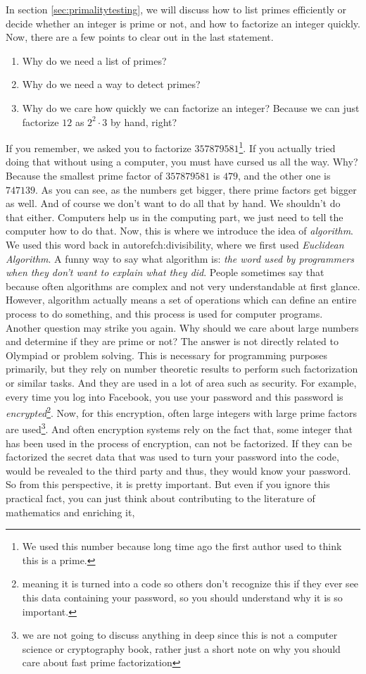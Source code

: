 \documentclass{subfiles}
\begin{document}
	In section \eqref{sec:primalitytesting}, we will discuss how to list primes efficiently or decide whether an integer is prime or not, and how to factorize an integer quickly. Now, there are a few points to clear out in the last statement.
		\begin{enumerate}
			\item Why do we need a list of primes?
			\item Why do we need a way to detect primes?
			\item Why do we care how quickly we can factorize an integer? Because we can just factorize $12$ as $2^2\cdot3$ by hand, right?
		\end{enumerate}
	If you remember, we asked you to factorize $357879581$\footnote{We used this number because long time ago the first author used to think this is a prime.}. If you actually tried doing that without using a computer, you must have cursed us all the way. Why? Because the smallest prime factor of $357879581$ is $479$, and the other one is $747139$. As you can see, as the numbers get bigger, there prime factors get bigger as well. And of course we don't want to do all that by hand. We shouldn't do that either. Computers help us in the computing part, we just need to tell the computer how to do that. Now, this is where we introduce the idea of \textit{algorithm}. We used this word back in autoref{ch:divisibility}, where we first used \textit{Euclidean Algorithm}. A funny way to say what algorithm is: \textit{the word used by programmers when they don't want to explain what they did}. People sometimes say that because often algorithms are complex and not very understandable at first glance. However, algorithm actually means a set of operations which can define an entire process to do something, and this process is used for computer programs. Another question may strike you again. Why should we care about large numbers and determine if they are prime or not? The answer is not directly related to Olympiad or problem solving. This is necessary for programming purposes primarily, but they rely on number theoretic results to perform such factorization or similar tasks. And they are used in a lot of area such as security. For example, every time you log into Facebook, you use your password and this password is \textit{encrypted}\footnote{meaning it is turned into a code so others don't recognize this if they ever see this data containing your password, so you should understand why it is so important.}. Now, for this encryption, often large integers with large prime factors are used\footnote{we are not going to discuss anything in deep since this is not a computer science or cryptography book, rather just a short note on why you should care about fast prime factorization}. And often encryption systems rely on the fact that, some integer that has been used in the process of encryption, can not be factorized. If they can be factorized the secret data that was used to turn your password into the code, would be revealed to the third party and thus, they would know your password. So from this perspective, it is pretty important. But even if you ignore this practical fact, you can just think about contributing to the literature of mathematics and enriching it, 
\end{document}
